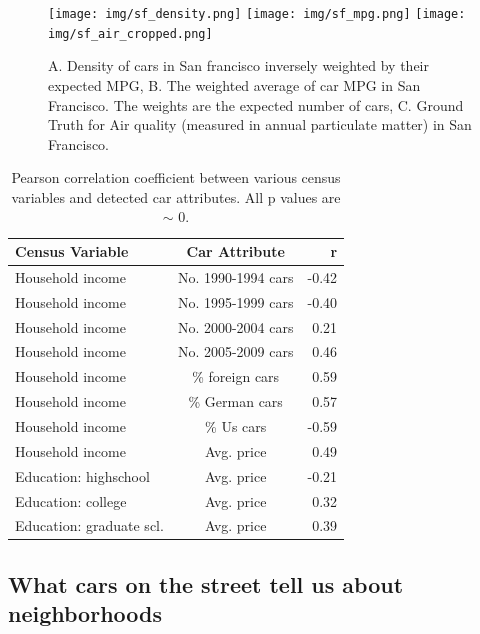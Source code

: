\documentclass[10pt,twocolumn,letterpaper]{article}
\begin{document}
\begin{figure}[t]
\begin{center}
  \raisebox{-.02\height}
 {
   \texttt{[image: img/sf\_density.png]}
 }
   \texttt{[image: img/sf\_mpg.png]}
   \texttt{[image: img/sf\_air\_cropped.png]}
\end{center}
   \caption {A. Density of cars in San francisco inversely weighted by their expected MPG, B. The weighted average of car MPG in San Francisco. The weights are the expected number of cars, C. Ground Truth for Air quality (measured in annual particulate matter) in San Francisco.}
\label{fig:pollution}
\end{figure}

\begin{table}
\begin{center}
\begin{tabular}{|l|c|r|}
\hline
\textbf{Census Variable} & \textbf{Car Attribute} & \textbf{r}  \\
\hline\hline
Household income & No. 1990-1994 cars & -0.42 \\
Household income & No. 1995-1999 cars & -0.40 \\
Household income & No. 2000-2004 cars & 0.21 \\
Household income & No. 2005-2009 cars & 0.46 \\
Household income & \% foreign cars & 0.59 \\
Household income & \% German cars & 0.57 \\
Household income & \% Us cars & -0.59 \\
Household income & Avg. price & 0.49 \\
Education: highschool & Avg. price & -0.21 \\
Education: college & Avg. price & 0.32 \\
Education: graduate scl. & Avg. price & 0.39 \\
\hline
\end{tabular}
\end{center}
\caption{Pearson correlation coefficient between various census variables and detected car attributes. All p values are \(\sim\) 0.}
\label{table:car-census-corrs}
\end{table}

\subsection{What cars on the street tell us about neighborhoods}
\end{document}
